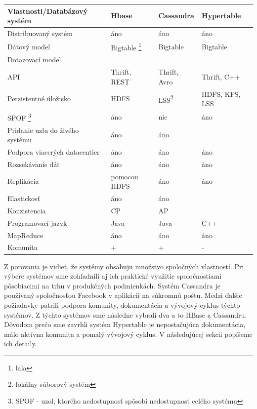 \documentclass[11pt,twoside,a4paper]{book}
\begin{document}
\begin{table}
    \begin{tabular}{|l|l|l|l|}
        \hline
        Vlastnosti/Databázový systém & Hbase & Cassandra & Hypertable \\  \hline
        Distribuovaný systém	& áno  & áno & áno \\ \hline 
        Dátový model		& Bigtable \footnote{lala} & Bigtable & Bigtable \\ \hline
        Dotazovací model	& ~  & ~ &  \\ \hline
	API 			& Thrift, REST  & Thrift, Avro & Thrift, C++ \\ \hline
        Perzistentné úložisko	& HDFS  & LSS\footnote{lokálny súborový systém} & HDFS, KFS, LSS \\ \hline
        SPOF \footnote{SPOF - uzol, ktorého nedostupnosť spôsobí nedostupnosť celého systému}	& áno  & nie & áno \\ \hline
	Pridanie uzlu do živého systému & áno  & áno & ~ \\ \hline
	Podpora viacerých datacentier & áno  & áno & áno \\ \hline
	Rozsekávanie dát 	& áno  & áno & áno \\ \hline
        Replikácia 		& pomocou HDFS  & áno & áno \\ \hline
	Elastickosť	        & áno  & áno & ~ \\ \hline
	Konzistencia 		& CP  & AP & ~ \\ \hline
	Programovací jazyk 	& Java  & Java & C++ \\ \hline
	MapReduce 		& áno  & áno & áno \\ \hline
	Komunita 		& +  & +  & - \\ \hline
    \end{tabular}
\end{table}



Z porovania je vidieť, že systémy obsahuju množstvo spoločných vlastností. Pri výbere systémov sme zohľadnili aj ich praktické využitie spoločnostiami pôsobiacimi na trhu v produkčných podmienkách. Systém Cassandra je používaný spoločnosťou Facebook v aplikácii na súkromnú poštu. Medzi ďalšie požiadavky patrili podpora komunity, dokumentácia a vývojový cyklus týchto systémov. Z týchto systémov sme následne vybrali dva a to HBase a Cassandru. Dôvodom prečo sme zavrhli systém Hypertable je nepostačujúca dokumentácia, málo aktívna komunita a pomalý vývojový cyklus. V následujúcej sekcii popíšeme ich detaily.
\end{document}
